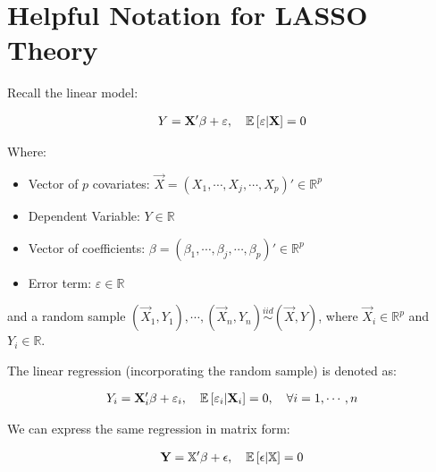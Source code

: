 \section{Helpful Notation for LASSO Theory}
\label{sec:notation-help-lasso}

Recall the linear model:

\begin{align*}
Y = \mathbf{X}'\beta + \varepsilon, 
    \quad \mathbb{E}\left[\varepsilon|\mathbf{X}\right] = 0
\end{align*}
 
Where:
\begin{itemize}
\item Vector of $p$ covariates: $\Vec{X} = (X_1, \cdots, X_j, \cdots , X_p)' \in \mathbb{R}^p$
\item Dependent Variable: $Y \in \mathbb{R}$
\item Vector of coefficients: $\beta = (\beta_1, \cdots, \beta_j, \cdots, \beta_p)' \in \mathbb{R}^p$
\item Error term: $\varepsilon \in \mathbb{R}$
\end{itemize}

and a random sample $(\Vec{X}_1, Y_1), \cdots, (\Vec{X}_n, Y_n) \overset{iid}{\sim} (\Vec{X}, Y)$, where $\Vec{X}_i \in \mathbb{R}^p$ and $Y_i \in \mathbb{R}$.

The linear regression (incorporating the random sample) is denoted as:

\begin{align*}
Y_i = \mathbf{X}_i'\beta + \varepsilon_i, 
    \quad \mathbb{E}\left[\varepsilon_i|\mathbf{X}_i\right] = 0, \quad \forall i = 1, \cdots, n
\end{align*}

We can express the same regression in matrix form:

\begin{align*}
\mathbf{Y} = \mathbb{X}'\beta + \epsilon, 
    \quad \mathbb{E}\left[\epsilon|\mathbb{X}\right] = 0
\end{align*}

